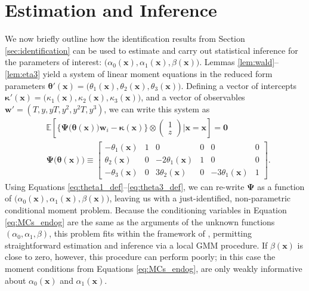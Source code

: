 \section{Estimation and Inference}
\label{sec:inference}
We now briefly outline how the identification results from Section \ref{sec:identification} can be used to estimate and carry out statistical inference for the parameters of interest: $\big(\alpha_0(\mathbf{x}), \alpha_1(\mathbf{x}), \beta(\mathbf{x})\big)$.
Lemmas \ref{lem:wald}--\ref{lem:eta3} yield a system of linear moment equations in the reduced form parameters $\boldsymbol{\theta}'(\mathbf{x}) = \big(\theta_1(\mathbf{x}), \theta_2(\mathbf{x}),\theta_3(\mathbf{x})\big)$.
Defining a vector of intercepts $\boldsymbol{\kappa}'(\mathbf{x}) = \big(\kappa_1(\mathbf{x}), \kappa_2(\mathbf{x}), \kappa_3(\mathbf{x})\big)$,
and a vector of observables $\mathbf{w}' = (T, y, yT, y^2, y^2 T, y^3)$, we can write this system as
\begin{align}
&\mathbb{E}\left[
  \bigg\{\boldsymbol{\Psi}\big(\boldsymbol{\theta}(\mathbf{x})\big)\mathbf{w}_i - \boldsymbol{\kappa}(\mathbf{x})\bigg\} \otimes 
\left(
\begin{array}{c}
  1 \\ z
\end{array}\right)\Bigg| \mathbf{x} = \boldsymbol{x}
\right] = \mathbf{0}
\label{eq:MCs_endog}\\
  &\boldsymbol{\Psi}\big(\boldsymbol{\theta}(\mathbf{x})\big) \equiv 
  \left[
  \begin{array}{rrrrrr}
    -\theta_1(\mathbf{x}) & 1 & 0 & 0 & 0 & 0\\
    \theta_2(\mathbf{x}) & 0 & -2\theta_1(\mathbf{x}) & 1 & 0 & 0\\ 
    -\theta_3(\mathbf{x}) & 0 & 3\theta_2(\mathbf{x}) & 0 & -3\theta_1(\mathbf{x}) & 1
\end{array}\right].
\end{align}
Using Equations \ref{eq:theta1_def}--\ref{eq:theta3_def}, we can re-write  $\mathbf{\Psi}$ as a function of $\big(\alpha_0(\mathbf{x}), \alpha_1(\mathbf{x}), \beta(\mathbf{x})\big)$, leaving us with a just-identified, non-parametric conditional moment problem.
Because the conditioning variables in Equation \ref{eq:MCs_endog} are the same as the arguments of the unknown functions $(\alpha_0, \alpha_1, \beta)$, this problem fits within the framework of \cite{Lewbel2007}, permitting straightforward estimation and inference via a local GMM procedure. 
If $\beta(\mathbf{x})$ is close to zero, however, this procedure can perform poorly; in this case the moment conditions from Equations \ref{eq:MCs_endog}, are only weakly informative about $\alpha_0(\mathbf{x})$ and $\alpha_1(\mathbf{x})$.
